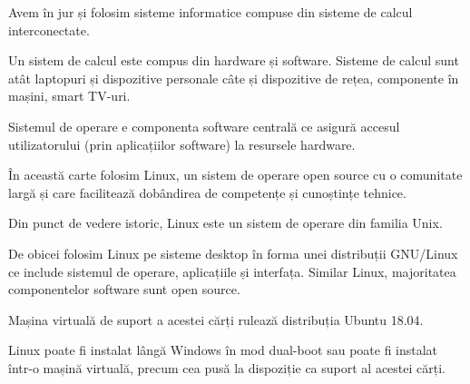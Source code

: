 Avem în jur și folosim sisteme informatice compuse din sisteme de calcul interconectate.

Un sistem de calcul este compus din hardware și software. Sisteme de calcul sunt atât laptopuri și dispozitive personale câte și dispozitive de rețea, componente în mașini, smart TV-uri.

Sistemul de operare e componenta software centrală ce asigură accesul utilizatorului (prin aplicațiilor software) la resursele hardware.

În această carte folosim Linux, un sistem de operare open source cu o comunitate largă și care facilitează dobândirea de competențe și cunoștințe tehnice.

Din punct de vedere istoric, Linux este un sistem de operare din familia Unix.

De obicei folosim Linux pe sisteme desktop în forma unei distribuții GNU/Linux ce include sistemul de operare, aplicațiile și interfața. Similar Linux, majoritatea componentelor software sunt open source.

Mașina virtuală de suport a acestei cărți rulează distribuția Ubuntu 18.04.

Linux poate fi instalat lângă Windows în mod dual-boot sau poate fi instalat într-o mașină virtuală, precum cea pusă la dispoziție ca suport al acestei cărți.
